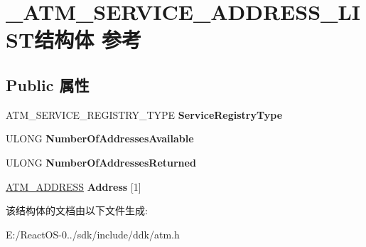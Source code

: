 \hypertarget{struct___a_t_m___s_e_r_v_i_c_e___a_d_d_r_e_s_s___l_i_s_t}{}\section{\+\_\+\+A\+T\+M\+\_\+\+S\+E\+R\+V\+I\+C\+E\+\_\+\+A\+D\+D\+R\+E\+S\+S\+\_\+\+L\+I\+S\+T结构体 参考}
\label{struct___a_t_m___s_e_r_v_i_c_e___a_d_d_r_e_s_s___l_i_s_t}
\subsection*{Public 属性}
\begin{DoxyCompactItemize}
\item 
\mbox{\label{struct___a_t_m___s_e_r_v_i_c_e___a_d_d_r_e_s_s___l_i_s_t_a4170a77b360ce88cd9bb4ffb382b400c}} 
A\+T\+M\+\_\+\+S\+E\+R\+V\+I\+C\+E\+\_\+\+R\+E\+G\+I\+S\+T\+R\+Y\+\_\+\+T\+Y\+PE {\bfseries Service\+Registry\+Type}
\item 
\mbox{\label{struct___a_t_m___s_e_r_v_i_c_e___a_d_d_r_e_s_s___l_i_s_t_acf01dd5c83b565e9e33ae05ca03ce7aa}} 
U\+L\+O\+NG {\bfseries Number\+Of\+Addresses\+Available}
\item 
\mbox{\label{struct___a_t_m___s_e_r_v_i_c_e___a_d_d_r_e_s_s___l_i_s_t_a8625e3eca751a2e8f1d83586cd4b5e60}} 
U\+L\+O\+NG {\bfseries Number\+Of\+Addresses\+Returned}
\item 
\mbox{\label{struct___a_t_m___s_e_r_v_i_c_e___a_d_d_r_e_s_s___l_i_s_t_ac7376fe95ba7a4b13c7ca6a046fda53f}} 
\hyperlink{struct_a_t_m___a_d_d_r_e_s_s}{A\+T\+M\+\_\+\+A\+D\+D\+R\+E\+SS} {\bfseries Address} \mbox{[}1\mbox{]}
\end{DoxyCompactItemize}


该结构体的文档由以下文件生成\+:\begin{DoxyCompactItemize}
\item 
E\+:/\+React\+O\+S-\/0../sdk/include/ddk/atm.\+h\end{DoxyCompactItemize}
